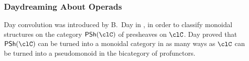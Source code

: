 \documentclass[11pt]{amsart}
\begin{document}
\subsubsection{Daydreaming About Operads}
Day convolution was introduced by B.\ Day in \cite{day:thesis,day:report}, in order to classify monoidal structures on the category $\PSh{\clC}$ of presheaves on $\clC$. Day proved that $\PSh{\clC}$ can be turned into a monoidal category in as many ways as $\clC$ can be turned into a pseudomonoid in the bicategory of profunctors.%
\end{document}
